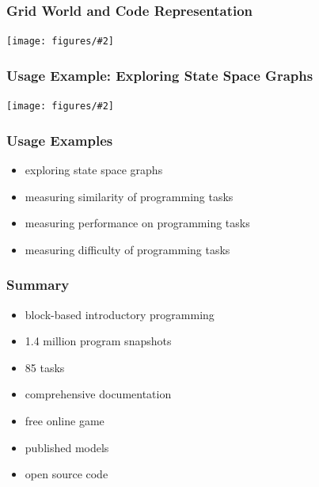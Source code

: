 \documentclass[bigger]{beamer}
\newcommand{\img}[2]{
  \begin{center}
    \texttt{[image: figures/\#2]}
  \end{center}
}
\begin{document}
\begin{frame}
  \frametitle{Grid World and Code Representation}

  \img{1.}{task-setting-solution}

\end{frame}


\begin{frame}
  \frametitle{Usage Example: Exploring State Space Graphs}

  \img{1.}{statespace-clean-path}

\end{frame}

\begin{frame}
  \frametitle{Usage Examples}

  \begin{itemize}
  \item exploring state space graphs  %
  \item measuring similarity of programming tasks
  \item measuring performance on programming tasks
  \item measuring difficulty of programming tasks
  \end{itemize}
\end{frame}


\begin{frame}
  \frametitle{Summary}

  \begin{itemize}
  \item block-based introductory programming
  \item 1.4 million program snapshots  %
  \item 85 tasks
  \item comprehensive documentation  %
  \item free online game
  \item published models
  \item open source code
  \end{itemize}
\end{frame}
\end{document}
